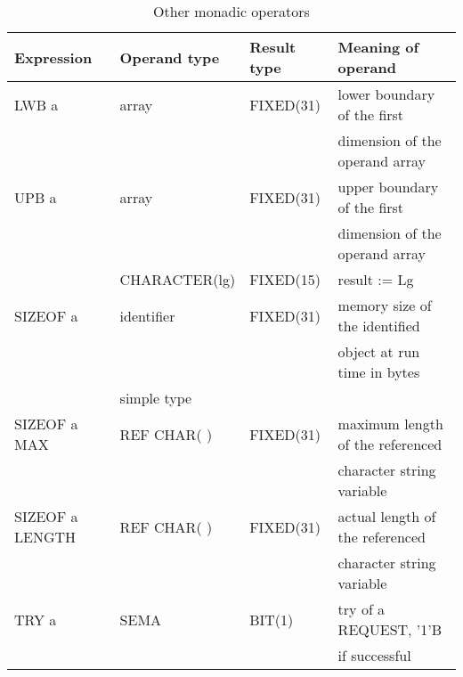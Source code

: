 \begin{table} %
\begin{center}
\caption{Other monadic operators}
\label{tab74}
\vspace{5mm}
\begin{tabular}{|l|l|l|l|}
\hline
{\bf Expression} & {\bf Operand type} & {\bf Result type} & {\bf Meaning of operand}\\ \hline

LWB a            & array              & FIXED(31)        & lower boundary of the first\\
                 &                    &                  & dimension of the operand array\\ \hline

UPB a            & array              & FIXED(31)        & upper boundary of the first\\
                 &                    &                  & dimension of the operand array\\ \cline{2-4}
                 & CHARACTER(lg)      & FIXED(15)        & result := Lg \\ \hline
 
SIZEOF a         & identifier         & FIXED(31)        & memory size of the identified\\
                 &                    &                  & object at run time in bytes\\ \cline{2-2} \cline{4-4}
                 & simple type        &                  & \\ \hline

SIZEOF a MAX     & REF CHAR( )        & FIXED(31)        & maximum length of the referenced\\
                 &                    &                  & character string variable\\ \hline

SIZEOF a LENGTH  & REF CHAR( )        & FIXED(31)        & actual length of the referenced\\
                 &                    &                  & character string variable\\ \hline

TRY a            & SEMA               & BIT(1)           & try of a REQUEST, '1'B\\
                 &                    &                  & if successful\\
\hline
\end{tabular}
\end{center}
\end{table}

